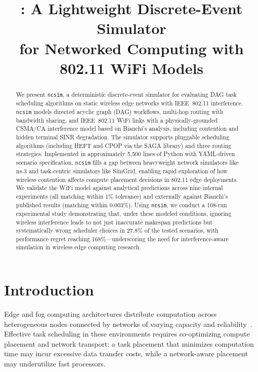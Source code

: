 \documentclass[conference]{IEEEtran}
\title{\ncsim{}: A Lightweight Discrete-Event Simulator\\for Networked Computing with 802.11 WiFi Models}
\author{
\IEEEauthorblockN{Bhaskar Krishnamachari\IEEEauthorrefmark{1},
Maya Gutierrez\IEEEauthorrefmark{1}, and
Jared Coleman\IEEEauthorrefmark{1}\IEEEauthorrefmark{2}}
\IEEEauthorblockA{\IEEEauthorrefmark{1}University of Southern California\\
bkrishna@usc.edu, mayaguti@usc.edu}
\IEEEauthorblockA{\IEEEauthorrefmark{2}Loyola Marymount University\\
jared.coleman@lmu.edu}
}
\newcommand{\ncsim}{\texttt{ncsim}}
\begin{document}
\maketitle

\begin{abstract}
We present \ncsim{}, a deterministic discrete-event simulator for evaluating
DAG task scheduling algorithms on static wireless edge networks with
IEEE~802.11 interference.
\ncsim{} models directed acyclic graph (DAG) workflows, multi-hop routing
with bandwidth sharing, and IEEE~802.11 WiFi links with a
physically-grounded CSMA/CA interference model based on Bianchi's analysis,
including contention and hidden terminal SINR degradation.
The simulator supports pluggable scheduling
algorithms (including HEFT and CPOP via the SAGA library) and three routing
strategies.
Implemented in approximately 5,500 lines of Python with YAML-driven scenario
specification, \ncsim{} fills a gap between heavyweight network simulators
like ns-3 and task-centric simulators like SimGrid, enabling rapid
exploration of how wireless contention affects compute placement decisions
in 802.11 edge deployments.  We validate the WiFi model against
analytical predictions across nine internal experiments (all matching within
1\% tolerance) and externally against Bianchi's published results (matching
within 0.003\%).  Using \ncsim{}, we conduct a 108-run experimental study
demonstrating that, under these modeled conditions, ignoring wireless
interference leads to not just inaccurate makespan predictions but
systematically wrong scheduler choices in 27.8\% of the tested scenarios,
with performance regret reaching 168\%---underscoring the need for
interference-aware simulation in wireless edge computing research.
\end{abstract}

\section{Introduction}
\label{sec:intro}

Edge and fog computing architectures distribute computation across
heterogeneous nodes connected by networks of varying capacity and
reliability~\cite{shi2016edge}.  Effective task scheduling in these
environments requires co-optimizing compute placement and network transport:
a task placement that minimizes computation time may incur excessive data
transfer costs, while a network-aware placement may underutilize fast
processors.
\end{document}
